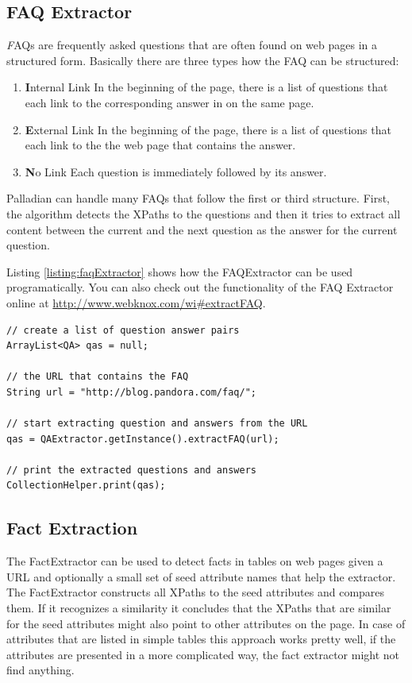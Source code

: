 \documentclass[a4paper,twoside]{book}      %
\begin{document}
\subsection{FAQ Extractor}
{\textit FAQs} are frequently asked questions that are often found on web pages in a structured form. Basically there are three types how the FAQ can be structured:
\begin{enumerate}
\item {\textbf Internal Link} In the beginning of the page, there is a list of questions that each link to the corresponding answer in on the same page.
\item {\textbf External Link} In the beginning of the page, there is a list of questions that each link to the the web page that contains the answer.
\item {\textbf No Link} Each question is immediately followed by its answer.
\end{enumerate}

Palladian can handle many FAQs that follow the first or third structure. First, the algorithm detects the XPaths to the questions and then it tries to extract all content between the current and the next question as the answer for the current question.

Listing \ref{listing:faqExtractor} shows how the FAQExtractor can be used programatically. You can also check out the functionality of the FAQ Extractor online at \url{http://www.webknox.com/wi#extractFAQ}.

\begin{codelisting}
\begin{lstlisting}[label=listing:faqExtractor,caption=Extract an FAQ from a web page.,frame=tb]
// create a list of question answer pairs
ArrayList<QA> qas = null;

// the URL that contains the FAQ
String url = "http://blog.pandora.com/faq/";

// start extracting question and answers from the URL
qas = QAExtractor.getInstance().extractFAQ(url);

// print the extracted questions and answers
CollectionHelper.print(qas);
\end{lstlisting}
\end{codelisting}

\subsection{Fact Extraction}
The FactExtractor can be used to detect facts in tables on web pages given a URL and optionally a small set of seed attribute names that help the extractor. The FactExtractor constructs all XPaths to the seed attributes and compares them. If it recognizes a similarity it concludes that the XPaths that are similar for the seed attributes might also point to other attributes on the page. In case of attributes that are listed in simple tables this approach works pretty well, if the attributes are presented in a more complicated way, the fact extractor might not find anything.
\end{document}

